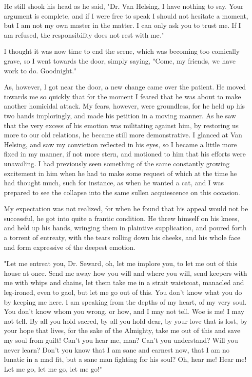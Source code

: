 He still shook his head as he said, "Dr. Van Helsing, I have nothing to say. Your argument is complete, and if I were free to speak I should not hesitate a moment, but I am not my own master in the matter. I can only ask you to trust me. If I am refused, the responsibility does not rest with me." 

I thought it was now time to end the scene, which was becoming too comically grave, so I went towards the door, simply saying, "Come, my friends, we have work to do. Goodnight." 

As, however, I got near the door, a new change came over the patient. He moved towards me so quickly that for the moment I feared that he was about to make another homicidal attack. My fears, however, were groundless, for he held up his two hands imploringly, and made his petition in a moving manner. As he saw that the very excess of his emotion was militating against him, by restoring us more to our old relations, he became still more demonstrative. I glanced at Van Helsing, and saw my conviction reflected in his eyes, so I became a little more fixed in my manner, if not more stern, and motioned to him that his efforts were unavailing. I had previously seen something of the same constantly growing excitement in him when he had to make some request of which at the time he had thought much, such for instance, as when he wanted a cat, and I was prepared to see the collapse into the same sullen acquiescence on this occasion. 

My expectation was not realized, for when he found that his appeal would not be successful, he got into quite a frantic condition. He threw himself on his knees, and held up his hands, wringing them in plaintive supplication, and poured forth a torrent of entreaty, with the tears rolling down his cheeks, and his whole face and form expressive of the deepest emotion. 

"Let me entreat you, Dr. Seward, oh, let me implore you, to let me out of this house at once. Send me away how you will and where you will, send keepers with me with whips and chains, let them take me in a strait waistcoat, manacled and leg-ironed, even to gaol, but let me go out of this. You don't know what you do by keeping me here. I am speaking from the depths of my heart, of my very soul. You don't know whom you wrong, or how, and I may not tell. Woe is me! I may not tell. By all you hold sacred, by all you hold dear, by your love that is lost, by your hope that lives, for the sake of the Almighty, take me out of this and save my soul from guilt! Can't you hear me, man? Can't you understand? Will you never learn? Don't you know that I am sane and earnest now, that I am no lunatic in a mad fit, but a sane man fighting for his soul? Oh, hear me! Hear me! Let me go, let me go, let me go!" 

